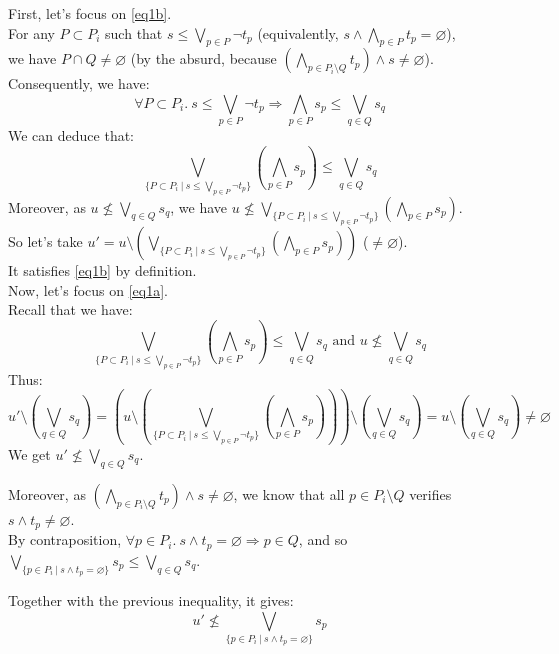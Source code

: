 \documentclass[a4paper]{article}%
\newcommand{\alt}{~|~}
\begin{document}
    First, let's focus on \cref{eq1b}.\\
    For any $P \subset P_i$ such that $s \leq \bigvee_{p \in P} \neg t_p$ (equivalently, $s \land \bigwedge_{p \in P} t_p = \varnothing$),\\
    we have $P \cap Q \neq \varnothing$ (by the absurd, because $(\bigwedge_{p\in P_i\setminus Q}t_p) \land s \neq \varnothing$).\\
    Consequently, we have:
    \[ \forall P \subset P_i.\ s \leq \bigvee_{p \in P} \neg t_p \Rightarrow \bigwedge_{p \in P} s_p \leq \bigvee_{q \in Q}s_q \]
    We can deduce that:
    \[ \bigvee_{\{P \subset P_i\alt s \leq \bigvee_{p \in P} \neg t_p\}} \left(\bigwedge_{p \in P} s_p\right) \leq \bigvee_{q \in Q}s_q \]
    Moreover, as $u \not\leq \bigvee_{q\in Q}s_q$, we have $u \not\leq \bigvee_{\{P \subset P_i\alt s \leq \bigvee_{p \in P} \neg t_p\}} \left(\bigwedge_{p \in P} s_p\right)$.\\
    So let's take $u' = u \setminus \left(\bigvee_{\{P \subset P_i\alt s \leq \bigvee_{p \in P} \neg t_p\}} \left(\bigwedge_{p \in P} s_p\right)\right)$ ($\neq \varnothing$).\\
    It satisfies \cref{eq1b} by definition.\\
    
    Now, let's focus on \cref{eq1a}.\\
    Recall that we have:
    \[ \bigvee_{\{P \subset P_i\alt s \leq \bigvee_{p \in P} \neg t_p\}} \left(\bigwedge_{p \in P} s_p\right) \leq \bigvee_{q \in Q}s_q
    \text{\ \ \ and\ \ \ } u \not\leq\bigvee_{q\in Q}s_q \]
    Thus:
    \[ u' \setminus \left(\bigvee_{q \in Q}s_q\right) = \left(u \setminus \left(\bigvee_{\{P \subset P_i\alt s \leq \bigvee_{p \in P} \neg t_p\}} \left(\bigwedge_{p \in P} s_p\right)\right)\right) \setminus \left(\bigvee_{q \in Q}s_q\right) = u \setminus \left(\bigvee_{q \in Q}s_q\right) \neq \varnothing \]
    We get $u' \not\leq \bigvee_{q \in Q}s_q$.

    Moreover, as $(\bigwedge_{p\in P_i\setminus Q}t_p) \land s \neq \varnothing$, we know that all $p \in P_i \setminus Q$ verifies $s \land t_p \neq \varnothing$.\\
    By contraposition, $\forall p \in P_i.\ s \land t_p = \varnothing \Rightarrow p \in Q$, and so $\bigvee_{\{p\in P_i\alt s\wedge t_p = \varnothing\}}s_p \leq \bigvee_{q \in Q}s_q$.

    Together with the previous inequality, it gives:
    \[ u' \not\leq \bigvee_{\{p\in P_i\alt s\wedge t_p = \varnothing\}}s_p \]
\end{document}

